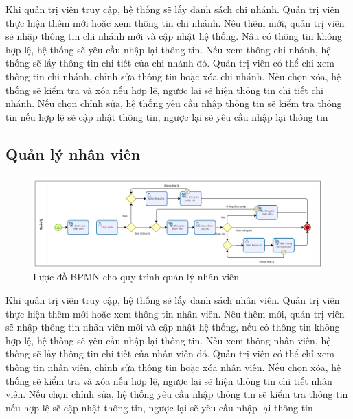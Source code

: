 Khi quản trị viên truy cập, hệ thống sẽ lấy danh sách chi nhánh. Quản trị viên thực hiện thêm mới hoặc xem thông tin chi nhánh. Nêu thêm mới, quản trị viên sẽ nhập thông tin chi nhánh mới và cập nhật hệ thống. Nâu có thông tin không hợp lệ, hệ thống sẽ yêu cầu nhập lại thông tin. Nếu xem thông chi nhánh, hệ thống sẽ lấy thông tin chi tiết của chi nhánh đó. Quản trị viên có thể chỉ xem thông tin chi nhánh, chỉnh sửa thông tin hoặc xóa chi nhánh. Nếu chọn xóa, hệ thống sẽ kiểm tra và xóa nếu hợp lệ, ngược lại sẽ hiện thông tin chi tiết chi nhánh. Nếu chọn chỉnh sửa, hệ thống yêu cầu nhập thông tin sẽ kiểm tra thông tin nếu hợp lệ sẽ cập nhật thông tin, ngược lại sẽ yêu cầu nhập lại thông tin


\subsection{Quản lý nhân viên}
\begin{figure}[!htp]
	\centering
	\includegraphics[width=16cm]{img/BPMN/Hien/Employee_Management.png}
	\newline
	\caption{Lược đồ BPMN cho quy trình quản lý nhân viên}
\end{figure}

Khi quản trị viên truy cập, hệ thống sẽ lấy danh sách nhân viên. Quản trị viên thực hiện thêm mới hoặc xem thông tin nhân viên. Nêu thêm mới, quản trị viên sẽ nhập thông tin nhân viên mới và cập nhật hệ thống, nếu có thông tin không hợp lệ, hệ thống sẽ yêu cầu nhập lại thông tin. Nếu xem thông nhân viên, hệ thống sẽ lấy thông tin chi tiết của nhân viên đó. Quản trị viên có thể chỉ xem thông tin nhân viên, chỉnh sửa thông tin hoặc xóa nhân viên. Nếu chọn xóa, hệ thống sẽ kiểm tra và xóa nếu hợp lệ, ngược lại sẽ hiện thông tin chi tiết nhân viên. Nếu chọn chỉnh sửa, hệ thống yêu cầu nhập thông tin sẽ kiểm tra thông tin nếu hợp lệ sẽ cập nhật thông tin, ngược lại sẽ yêu cầu nhập lại thông tin

